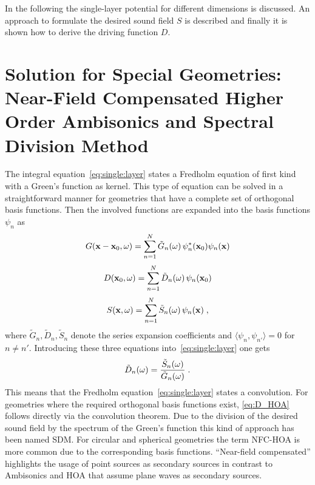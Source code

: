 In the following the single-layer potential for different
dimensions is discussed. An approach
to formulate the desired sound field $S$ is described and finally it is
shown how to derive the driving function $D$.


\section[Near-Field Compensated Higher Order Ambisonics]{Solution for Special
Geometries: Near-Field Compensated Higher Order Ambisonics and Spectral Division Method}
\label{sec:HOA_SDM}

The integral equation~\eqref{eq:single:layer} states a Fredholm
equation of first kind with a Green's function as kernel. This type of equation
can be solved in a straightforward manner for geometries that have a complete
set of orthogonal basis functions. Then the involved functions are expanded
into the basis functions $\psi_n$ as\autocite[Compare][p.\,940]{Morse1981}
%
\begin{equation}
    G(\x-\x_0,\omega) = \sum_{n=1}^N \tilde{G}_n(\omega) \,
        \psi_n^*(\x_0) \psi_n(\x)
    \label{eq:G_expansion}
\end{equation}
%
\begin{equation}
    D(\x_0,\omega) = \sum_{n=1}^N \tilde{D}_n(\omega) \,
        \psi_n(\x_0)
    \label{eq:D_expansion}
\end{equation}
%
\begin{equation}
    S(\x,\omega) = \sum_{n=1}^N \tilde{S}_n(\omega) \,
        \psi_n(\x) \qc
    \label{eq:S_expansion}
\end{equation}
%
where $\tilde{G}_n, \tilde{D}_n, \tilde{S}_n$ denote the series expansion
coefficients and \linebreak $\langle\psi_n, \psi_{n'}\rangle = 0$ for $n \ne n'$.
Introducing these three equations
into~\eqref{eq:single:layer} one gets
%
\begin{equation}
    \tilde{D}_n(\omega) = \frac{\tilde{S}_n(\omega)}{\tilde{G}_n(\omega)} \qp
    \label{eq:D_HOA}
\end{equation}
%
This means that the Fredholm equation~\eqref{eq:single:layer}
states a convolution. For geometries where
the required orthogonal basis functions exist, \eqref{eq:D_HOA} follows directly via
the convolution theorem.\autocite[Compare][p.\,1013]{Arfken2005}
Due to the division of the desired sound field by the spectrum of the
Green's function this kind
of approach has been named \acf{SDM}.
For circular and spherical geometries the term \acf{NFC-HOA} is more common due
to the corresponding basis functions. ``Near-field compensated'' highlights the
usage of point sources as secondary sources in contrast to Ambisonics and
\acf{HOA} that assume plane waves as secondary sources.

